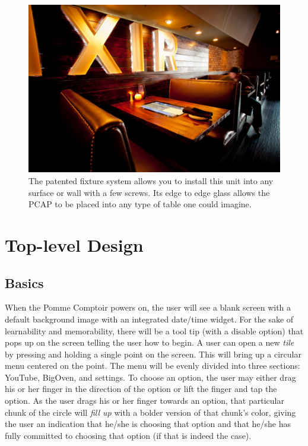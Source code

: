 \documentclass[fleqn,10pt]{wlpeerj}
\begin{document}
\begin{figure}[ht]
\centering
\includegraphics[width=\linewidth]{PCAP_restaurant.jpg}
\caption{The patented fixture system allows you to install this unit into any surface or wall with a few screws. Its edge to edge glass allows the PCAP to be placed into any type of table one could imagine.}
\label{fig:PCAP_restaurant}
\end{figure}

\section*{Top-level Design}
\subsection*{Basics}
When the Pomme Comptoir powers on, the user will see a blank screen with a default background image with an integrated date/time widget. For the sake of learnability and memorability, there will be a tool tip (with a disable option) that pops up on the screen telling the user how to begin. A user can open a new \emph{tile} by pressing and holding a single point on the screen. This will bring up a circular menu centered on the point. The menu will be evenly divided into three sections: YouTube, BigOven, and settings. To choose an option, the user may either drag his or her finger in the direction of the option or lift the finger and tap the option. As the user drags his or her finger towards an option, that particular chunk of the circle will \emph{fill up} with a bolder version of that chunk's color, giving the user an indication that he/she is choosing that option and that he/she has fully committed to choosing that option (if that is indeed the case).
\end{document}
